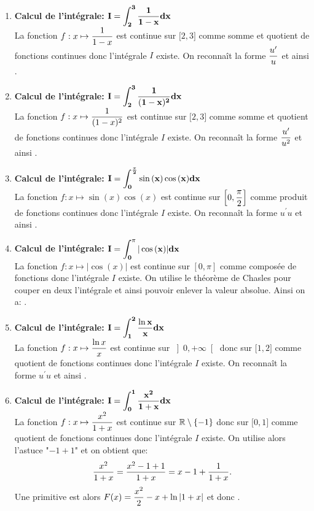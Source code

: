 \documentclass[a4paper, 11pt,reqno]{article}
\begin{document}
\begin{correction}  \;
	\begin{enumerate}
		\item \textbf{Calcul de l'int\'egrale: $\mathbf{\displaystyle I=\int_{2}^{3} \displaystyle\frac{1}{1-x} dx}$}\\
		      \noindent La fonction $f: x\mapsto \displaystyle\frac{1}{1-x} $ est continue sur $\lbrack 2,3\rbrack$ comme somme et quotient de fonctions continues donc l'int\'egrale $I$ existe. On reconna\^{i}t la forme $\displaystyle\frac{u^{\prime}}{u}$ et ainsi .
		\item \textbf{Calcul de l'int\'egrale: $\mathbf{\displaystyle I=\int_{2}^{3} \displaystyle\frac{1}{(1-x)^2} dx }$}\\
		      \noindent La fonction $f: x\mapsto \displaystyle\frac{1}{(1-x)^2}  $ est continue sur $\lbrack 2,3\rbrack$ comme somme et quotient de fonctions continues donc l'int\'egrale $I$ existe. On reconna\^{i}t la forme $\displaystyle\frac{u^{\prime}}{u^2}$ et ainsi .
		\item \textbf{Calcul de l'int\'egrale: $\mathbf{\displaystyle I=\int_{0}^{\frac{\pi}{2}} \sin{(x)}\cos{(x)} dx} $}\\
		      \noindent La fonction $f: x\mapsto \sin{(x)}\cos{(x)}  $ est continue sur $\left\lbrack 0,\displaystyle\frac{\pi}{2}\right\rbrack$ comme produit de fonctions continues donc l'int\'egrale $I$ existe. On reconna\^{i}t la forme $u^{\prime}u$ et ainsi .
		\item \textbf{Calcul de l'int\'egrale: $\mathbf{\displaystyle I=\int_{0}^{\pi} |\cos{(x)}| dx}$}\\
		      \noindent La fonction $f: x\mapsto |\cos{(x)}|  $ est continue sur $\left\lbrack 0,\pi \right\rbrack$ comme compos\'ee de fonctions donc l'int\'egrale $I$ existe. On utilise le th\'eor\`{e}me de Chasles pour couper en deux l'int\'egrale et ainsi pouvoir enlever la valeur absolue. Ainsi on a: .
		\item \textbf{Calcul de l'int\'egrale: $\mathbf{\displaystyle I=\int_{1}^{2} \displaystyle\frac{\ln{x}}{x} dx }$}\\
		      \noindent La fonction $f: x\mapsto  \displaystyle\frac{\ln{x}}{x}$ est continue sur $\left\rbrack 0,+\infty\right\lbrack$ donc sur $\lbrack 1,2\rbrack$ comme quotient de fonctions continues donc l'int\'egrale $I$ existe. On reconna\^{i}t la forme $u^{\prime}u$ et ainsi .
		\item \textbf{Calcul de l'int\'egrale: $\mathbf{\displaystyle I=\int_{0}^{1} \displaystyle\frac{x^2}{1+x} dx}$}\\
		      \noindent La fonction $f: x\mapsto \displaystyle\frac{x^2}{1+x} $ est continue sur $\mathbb{R}\setminus\lbrace -1\rbrace$ donc sur $\lbrack 0,1\rbrack$  comme quotient de fonctions continues donc l'int\'egrale $I$ existe. On utilise alors l'astuce "$-1+1$" et on obtient que:
		      $$\displaystyle\frac{x^2}{1+x}=\displaystyle\frac{x^2-1+1}{1+x}=x-1+\displaystyle\frac{1}{1+x}.$$
		      Une primitive est alors $F(x)=\displaystyle\frac{x^2}{2}-x+\ln{|1+x|}$ et donc .
	\end{enumerate}
\end{correction}
\end{document}
